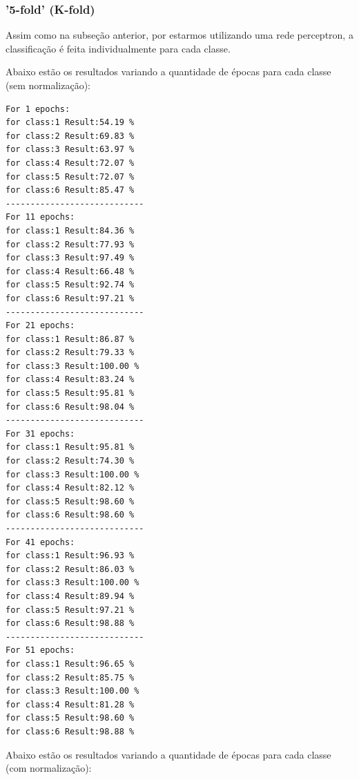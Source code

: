 \documentclass[paper=a4, fontsize=11pt]{scrartcl}
\numberwithin{equation}{section}		%
\numberwithin{figure}{section}			%
\numberwithin{table}{section}				%
\begin{document}
	\subsubsection{'5-fold' (K-fold) }
	
	Assim como na subseção anterior, por estarmos utilizando uma rede perceptron, a classificação é feita individualmente para cada classe.
	
	Abaixo estão os resultados variando a quantidade de épocas para cada classe (sem normalização):
	
	\begin{multicols}{2}
    	\begin{verbatim}
For 1 epochs:
for class:1 Result:54.19 %
for class:2 Result:69.83 %
for class:3 Result:63.97 %
for class:4 Result:72.07 %
for class:5 Result:72.07 %
for class:6 Result:85.47 %
----------------------------
For 11 epochs:
for class:1 Result:84.36 %
for class:2 Result:77.93 %
for class:3 Result:97.49 %
for class:4 Result:66.48 %
for class:5 Result:92.74 %
for class:6 Result:97.21 %
----------------------------
For 21 epochs:
for class:1 Result:86.87 %
for class:2 Result:79.33 %
for class:3 Result:100.00 %
for class:4 Result:83.24 %
for class:5 Result:95.81 %
for class:6 Result:98.04 %
----------------------------
For 31 epochs:
for class:1 Result:95.81 %
for class:2 Result:74.30 %
for class:3 Result:100.00 %
for class:4 Result:82.12 %
for class:5 Result:98.60 %
for class:6 Result:98.60 %
----------------------------
For 41 epochs:
for class:1 Result:96.93 %
for class:2 Result:86.03 %
for class:3 Result:100.00 %
for class:4 Result:89.94 %
for class:5 Result:97.21 %
for class:6 Result:98.88 %
----------------------------
For 51 epochs:
for class:1 Result:96.65 %
for class:2 Result:85.75 %
for class:3 Result:100.00 %
for class:4 Result:81.28 %
for class:5 Result:98.60 %
for class:6 Result:98.88 %

    	\end{verbatim}
    \end{multicols}
    
    Abaixo estão os resultados variando a quantidade de épocas para cada classe (com normalização):
	
\end{document}
